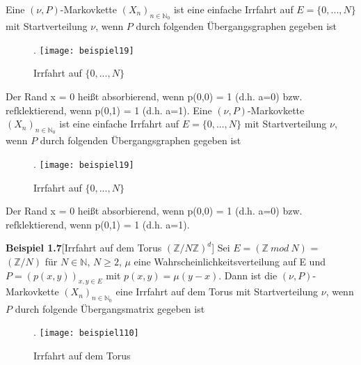 Eine $(\nu,P)$-Markovkette $(X_{n})_{n \in \mathbb{N}_{0}}$ ist eine einfache Irrfahrt auf $E = \lbrace0,...,N \rbrace$ mit Startverteilung $\nu$, wenn $P$ durch folgenden Übergangsgraphen gegeben ist
\begin{figure}[H].
\centering
\texttt{[image: beispiel19]}
\caption{Irrfahrt auf $\lbrace 0,...,N \rbrace$}
\end{figure}
\noindent
Der Rand x = 0 heißt absorbierend, wenn p(0,0) = 1 (d.h. a=0) bzw. refklektierend, wenn p(0,1) = 1 (d.h. a=1).
Eine $(\nu,P)$-Markovkette $(X_{n})_{n \in \mathbb{N}_{0}}$ ist eine einfache Irrfahrt auf $E = \lbrace0,...,N \rbrace$ mit Startverteilung $\nu$, wenn $P$ durch folgenden Übergangsgraphen gegeben ist
\begin{figure}[H].
\centering
\texttt{[image: beispiel19]}
\caption{Irrfahrt auf $\lbrace 0,...,N \rbrace$}
\end{figure}
\noindent
Der Rand x = 0 heißt absorbierend, wenn p(0,0) = 1 (d.h. a=0) bzw. refklektierend, wenn p(0,1) = 1 (d.h. a=1).



\textbf{Beispiel 1.7}[Irrfahrt auf dem Torus ${(\mathbb{Z}/N\mathbb{Z})}^{d}$]
Sei $E = (\mathbb{Z} \: mod \: N)$ = $( \mathbb{Z}/N)$ für $N \in \mathbb{N}$, $N \ge 2$, $\mu$ eine Wahrscheinlichkeitsverteilung auf E  und $P =(p(x,y))_{x,y \in E}$ mit $p(x,y) = \mu(y-x)$. Dann ist die $(\nu,P)$-Markovkette $(X_{n})_{n \in \mathbb{N}_{0}}$ eine Irrfahrt auf dem Torus mit Startverteilung $\nu$, wenn $P$ durch folgende Übergangsmatrix gegeben ist
\begin{figure}[H].
\centering
\texttt{[image: beispiel110]}
\caption{Irrfahrt auf dem Torus}
\end{figure}